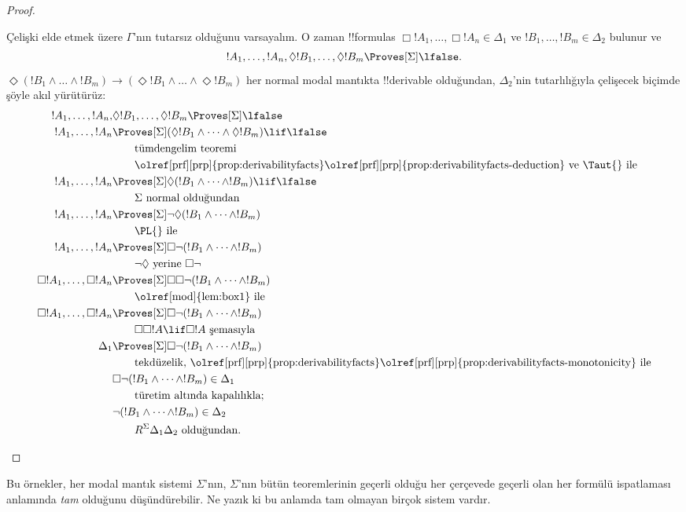 \documentclass[../../../include/open-logic-section]{subfiles}
\begin{document}
\begin{proof}
\begin{enumerate}
    Çelişki elde etmek üzere $\Gamma$'nın tutarsız olduğunu varsayalım.
    O zaman !!{formula}s $\Box!A_1,\dots,\Box!A_n\in\Delta_1$ ve
    $!B_1,\dots,!B_m\in\Delta_2$ bulunur ve
    \[!A_1,\dots,!A_n,\Diamond!B_1,\dots,\Diamond!B_m
      \Proves[\Sigma]\lfalse.\]
    $\Diamond(!B_1\land\dots\land !B_m)\to
    (\Diamond!B_1\land\dots\land\Diamond!B_m)$ her normal modal mantıkta
    !!{derivable} olduğundan, $\Delta_2$'nin tutarlılığıyla çelişecek biçimde
    şöyle akıl yürütürüz:
    \begin{align*}
      !A_1, \dots, !A_n, & \Diamond!B_1, \dots,
      \Diamond!B_m \Proves[\Sigma] \lfalse \\
      !A_1, \dots,!A_n & \Proves[\Sigma] (\Diamond!B_1 \land
      \dots \land \Diamond!B_m) \lif \lfalse\\
      & \qquad\text{tümdengelim teoremi}\\
      & \qquad\text{\olref[prf][prp]{prop:derivabilityfacts}\olref[prf][prp]{prop:derivabilityfacts-deduction} ve \Taut{} ile} \\
      !A_1, \dots,!A_n & \Proves[\Sigma]
      \Diamond(!B_1 \land \dots \land !B_m) \lif \lfalse\\
      & \qquad \text{$\Sigma$ normal olduğundan} \\
      !A_1, \dots,!A_n & \Proves[\Sigma]
      \lnot\Diamond (!B_1 \land \dots \land !B_m)\\
      & \qquad\text{\PL{} ile} \\
      !A_1, \dots,!A_n & \Proves[\Sigma]
      \Box\lnot (!B_1 \land \dots \land !B_m)\\
      & \qquad\text{$\lnot\Diamond$ yerine $\Box\lnot$} \\
      \Box!A_1, \dots,\Box!A_n
      & \Proves[\Sigma] \Box\Box \lnot (!B_1 \land \dots \land !B_m)\\
      & \qquad\text{\olref[mod]{lem:box1} ile} \\
      \Box!A_1, \dots,\Box!A_n
      & \Proves[\Sigma]
      \Box\lnot (!B_1 \land \dots \land !B_m)\\
      &\qquad\text{$\Box\Box!A\lif\Box!A$ şemasıyla} \\
      \Delta_1 & \Proves[\Sigma]
      \Box\lnot (!B_1 \land \dots \land !B_m)\\
      &\qquad\text{tekdüzelik,
      \olref[prf][prp]{prop:derivabilityfacts}\olref[prf][prp]{prop:derivabilityfacts-monotonicity} ile} \\
      & \Box\lnot (!B_1 \land \dots \land !B_m) \in \Delta_1\\
      &\qquad\text{türetim altında kapalılıkla}; \\
      & \lnot (!B_1 \land \dots \land !B_m) \in \Delta_2\\
      &\qquad \text{$R^\Sigma\Delta_1\Delta_2$ olduğundan.}
    \end{align*}
  \end{enumerate}
\end{proof}

Bu örnekler, her modal mantık sistemi $\Sigma$'nın, $\Sigma$'nın bütün
teoremlerinin geçerli olduğu her çerçevede geçerli olan her formülü
ispatlaması anlamında \emph{tam} olduğunu düşündürebilir. Ne yazık ki bu
anlamda tam olmayan birçok sistem vardır.
\end{document}

